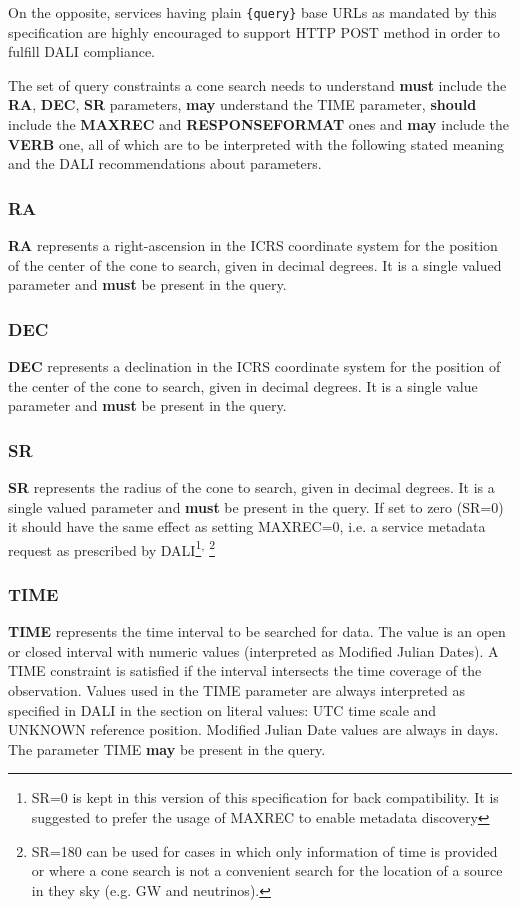 \documentclass[11pt,a4paper]{ivoa} 
\begin{document}
On the opposite, services having plain \texttt{\{query\}} base URLs as
mandated by this specification are highly encouraged to support HTTP
POST method in order to fulfill DALI compliance.

The set of query constraints a cone search needs to understand
\textbf{must} include the \textbf{RA}, \textbf{DEC}, \textbf{SR}
parameters, \textbf{may} understand the TIME parameter,
\textbf{should} include the \textbf{MAXREC} and \textbf{RESPONSEFORMAT}
ones and \textbf{may} include the \textbf{VERB} one, all of which are to
be interpreted with the following stated meaning and the DALI
recommendations about parameters.

\subsubsection{RA} \textbf{RA} represents a right-ascension in the ICRS
coordinate system for the position of the center of the cone to search,
given in decimal degrees. It is a single valued parameter and
\textbf{must} be present in the query.

\subsubsection{DEC} \textbf{DEC} represents a declination in the ICRS
coordinate system for the position of the center of the cone to search,
given in decimal degrees. It is a single value parameter and
\textbf{must} be present in the query.

\subsubsection{SR} \textbf{SR} represents the radius of the cone to
search, given in decimal degrees. It is a single valued parameter and
\textbf{must} be present in the query. If set to zero (SR=0) it should
have the same effect as setting MAXREC=0, i.e. a service metadata
request as prescribed by DALI\footnote{SR=0 is kept in this version of
this specification for back compatibility. It is suggested to prefer the
usage of MAXREC to enable metadata discovery}\textsuperscript{,
}\footnote{SR=180 can be used for cases in which only information of
time is provided or where a cone search is not a convenient search for
the location of a source in they sky (e.g. GW and neutrinos).}

\subsubsection{TIME} \textbf{TIME} represents the time interval to be
searched for data. The value is an open or closed interval with numeric
values (interpreted as Modified Julian Dates). A TIME constraint is
satisfied if the interval intersects the time coverage of the
observation. Values used in the TIME parameter are always interpreted as
specified in DALI in the section on literal values: UTC time scale and
UNKNOWN reference position. Modified Julian Date values are always in
days. The parameter TIME \textbf{may} be present in the query. 
\end{document}
